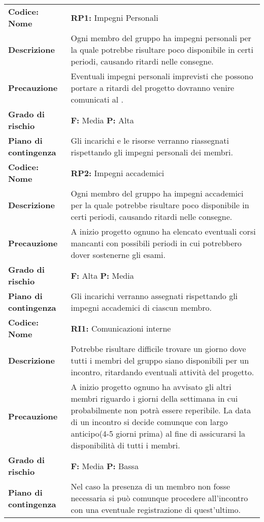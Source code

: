 {\begin{longtable}{C{3.5cm} | C{11cm}}
\textbf{Codice: Nome} & \textbf{RP1: }{Impegni Personali}\\
\textbf{Descrizione} & Ogni membro del gruppo ha impegni personali per la quale potrebbe risultare poco disponibile in certi periodi, causando ritardi nelle consegne.\\ 
\textbf{Precauzione} & Eventuali impegni personali imprevisti che possono portare a ritardi del progetto dovranno venire comunicati al \respProg{}.\\
\textbf{Grado di rischio} & \textbf{F: }Media \textbf{P: }Alta\\ 
\textbf{Piano di contingenza} & Gli incarichi e le risorse verranno riassegnati rispettando gli impegni personali dei membri.\\
\hline
\hline
{}\textbf{Codice: Nome} & \textbf{RP2: }{Impegni accademici}\\ 
\textbf{Descrizione} & Ogni membro del gruppo ha impegni accademici per la quale potrebbe risultare poco disponibile in certi periodi, causando ritardi nelle consegne.\\ 
\textbf{Precauzione} & A inizio progetto ognuno ha elencato eventuali corsi mancanti con possibili periodi in cui potrebbero dover sostenerne gli esami.\\
\textbf{Grado di rischio} & \textbf{F: }Alta \textbf{P: }Media\\
\textbf{Piano di contingenza} & Gli incarichi verranno assegnati rispettando gli impegni accademici di ciascun membro.\\
\hline

\textbf{Codice: Nome} & \textbf{RI1: }{Comunicazioni interne}\\
\textbf{Descrizione} & Potrebbe risultare difficile trovare un giorno dove tutti i membri del gruppo siano disponibili per un incontro, ritardando eventuali attività del progetto.\\ 
\textbf{Precauzione} & A inizio progetto ognuno ha avvisato gli altri membri riguardo i giorni della settimana in cui probabilmente non potrà essere reperibile. La data di un incontro si decide comunque con largo anticipo(4-5 giorni prima) al fine di assicurarsi la disponibilità di tutti i membri.\\
\textbf{Grado di rischio} & \textbf{F: }Media \textbf{P: }Bassa\\
\textbf{Piano di contingenza} & Nel caso la presenza di un membro non fosse necessaria si può comunque procedere all'incontro con una eventuale registrazione di quest'ultimo.\\
\hline


\end{longtable}}
